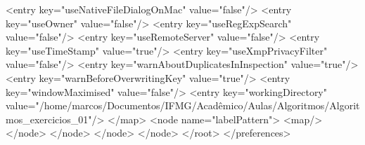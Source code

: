 \begin{codigo}[caption={Código de configuração do programa JabRef em XML}, label={codigo:config-jabref}, language=XML, breaklines=true]
            <entry key="useNativeFileDialogOnMac" value="false"/>
            <entry key="useOwner" value="false"/>
            <entry key="useRegExpSearch" value="false"/>
            <entry key="useRemoteServer" value="false"/>
            <entry key="useTimeStamp" value="true"/>
            <entry key="useXmpPrivacyFilter" value="false"/>
            <entry key="warnAboutDuplicatesInInspection" value="true"/>
            <entry key="warnBeforeOverwritingKey" value="true"/>
            <entry key="windowMaximised" value="false"/>
            <entry key="workingDirectory" value="/home/marcos/Documentos/IFMG/Acadêmico/Aulas/Algoritmos/Algoritmos_exercicios_01"/>
          </map>
          <node name="labelPattern">
            <map/>
          </node>
        </node>
      </node>
    </node>
  </root>
</preferences>

\end{codigo}